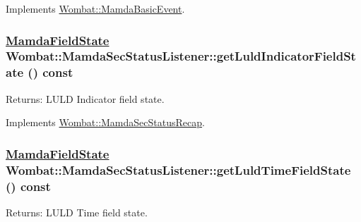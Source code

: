 Implements \hyperlink{classWombat_1_1MamdaBasicEvent_51cc0b9d4c2b8a982ccd18b339707cb5}{Wombat::Mamda\-Basic\-Event}.\hypertarget{classWombat_1_1MamdaSecStatusListener_1e65d16674a50306ed0c455e9b1c7dcd}{
\subsubsection[getLuldIndicatorFieldState]{\setlength{\rightskip}{0pt plus 5cm}\hyperlink{namespaceWombat_93aac974f2ab713554fd12a1fa3b7d2a}{Mamda\-Field\-State} Wombat::Mamda\-Sec\-Status\-Listener::get\-Luld\-Indicator\-Field\-State () const}}
\label{classWombat_1_1MamdaSecStatusListener_1e65d16674a50306ed0c455e9b1c7dcd}


\begin{Desc}
\item[Returns:]LULD Indicator field state. \end{Desc}


Implements \hyperlink{classWombat_1_1MamdaSecStatusRecap_cd0efb75dca37116bc753835ac720b01}{Wombat::Mamda\-Sec\-Status\-Recap}.\hypertarget{classWombat_1_1MamdaSecStatusListener_fa4c37602326edad8f06d582e7e843a0}{
\subsubsection[getLuldTimeFieldState]{\setlength{\rightskip}{0pt plus 5cm}\hyperlink{namespaceWombat_93aac974f2ab713554fd12a1fa3b7d2a}{Mamda\-Field\-State} Wombat::Mamda\-Sec\-Status\-Listener::get\-Luld\-Time\-Field\-State () const}}
\label{classWombat_1_1MamdaSecStatusListener_fa4c37602326edad8f06d582e7e843a0}


\begin{Desc}
\item[Returns:]LULD Time field state. \end{Desc}


